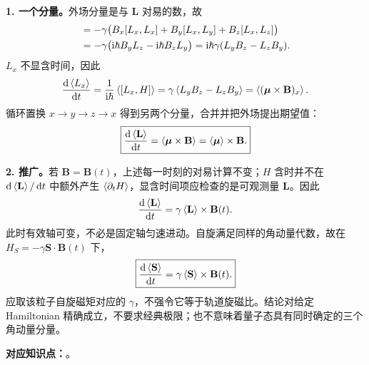 \begin{checkedsolution}
\textbf{1. 一个分量。}外场分量是与 $\mathbf L$ 对易的数，故
\begin{align}
  [L_x,H]
    &=-\gamma\bigl(B_x[L_x,L_x]+B_y[L_x,L_y]+B_z[L_x,L_z]\bigr)\notag\\
    &=-\gamma\bigl(\ii\hbar B_yL_z-\ii\hbar B_zL_y\bigr)
      =\ii\hbar\gamma(L_yB_z-L_zB_y).
\end{align}
$L_x$ 不显含时间，因此
\begin{equation}
  \frac{\mathop{}\!\mathrm{d}\left\langle L_x \right\rangle}{\mathop{}\!\mathrm{d} t}
    =\frac1{\mathrm{i}\hbar}\left\langle [L_x,H] \right\rangle
    =\gamma\left\langle L_yB_z-L_zB_y \right\rangle
    =\left\langle (\boldsymbol\mu\times\mathbf B)_x \right\rangle.
\end{equation}
循环置换 $x\to y\to z\to x$ 得到另两个分量，合并并把外场提出期望值：
\begin{equation}
  \boxed{\frac{\mathop{}\!\mathrm{d}\left\langle \mathbf L \right\rangle}{\mathop{}\!\mathrm{d} t}
     =\left\langle \boldsymbol\mu\times\mathbf B \right\rangle
     =\left\langle \boldsymbol\mu \right\rangle\times\mathbf B.}
\end{equation}

\textbf{2. 推广。}若 $\mathbf B=\mathbf B(t)$，上述每一时刻的对易计算不变；$H$ 含时并不在 $\mathop{}\!\mathrm{d}\left\langle \mathbf L \right\rangle/\mathop{}\!\mathrm{d} t$ 中额外产生 $\left\langle \partial_tH \right\rangle$，显含时间项应检查的是可观测量 $\mathbf L$。因此
\begin{equation}
  \frac{\mathop{}\!\mathrm{d}\left\langle \mathbf L \right\rangle}{\mathop{}\!\mathrm{d} t}
       =\gamma\left\langle \mathbf L \right\rangle\times\mathbf B(t).
\end{equation}
此时有效轴可变，不必是固定轴匀速进动。自旋满足同样的角动量代数，故在 $H_S=-\gamma\mathbf S\cdot\mathbf B(t)$ 下，
\begin{equation}
  \boxed{\frac{\mathop{}\!\mathrm{d}\left\langle \mathbf S \right\rangle}{\mathop{}\!\mathrm{d} t}
       =\gamma\left\langle \mathbf S \right\rangle\times\mathbf B(t).}
\end{equation}
应取该粒子自旋磁矩对应的 $\gamma$，不强令它等于轨道旋磁比。结论对给定 Hamiltonian 精确成立，不要求经典极限；也不意味着量子态具有同时确定的三个角动量分量。
\end{checkedsolution}

\textbf{对应知识点：}。

